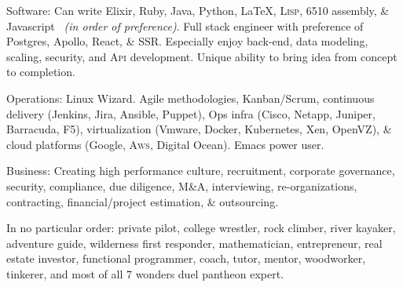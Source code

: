 \documentclass[10pt,a4paper]{article}
\begin{document}

\inlineheadsection  %
  {Software:}
  {Can write Elixir, Ruby, Java, Python, \LaTeX, {\textsc{Lisp}}, 6510 assembly, \& Javascript 
  \textnormal{\textit{~(in order of preference)}}. Full stack engineer with preference of Postgres, Apollo, React, & SSR. Especially enjoy back-end, data modeling, scaling, security, and {\textsc{Api}} development. Unique ability to bring idea from concept to completion. }

\vspace{0.4em}
\inlineheadsection
  {Operations:}  
  {Linux Wizard. Agile methodologies, Kanban/Scrum, continuous delivery (Jenkins, Jira, Ansible, Puppet), Ops infra (Cisco, Netapp, Juniper, Barracuda, F5), virtualization (Vmware, Docker, Kubernetes, Xen, OpenVZ), \& cloud platforms (Google, {\textsc{Aws}}, Digital Ocean). Emacs power user.}

\vspace{0.4em}
\inlineheadsection
  {Business:}
  {Creating high performance culture, recruitment, corporate governance, security, compliance, due diligence, M\&A, interviewing, re-organizations, contracting, financial/project estimation, \& outsourcing. }

\spacedhrule{1.6em}{-0.5em}


\inlineheadsection
  {In no particular order:}
  {private pilot, college wrestler, rock climber, river kayaker, adventure guide, wilderness first responder, mathematician, entrepreneur, real estate investor, functional programmer, coach, tutor, mentor, woodworker, tinkerer, and most of all 7 wonders duel pantheon expert. }
\end{document}
